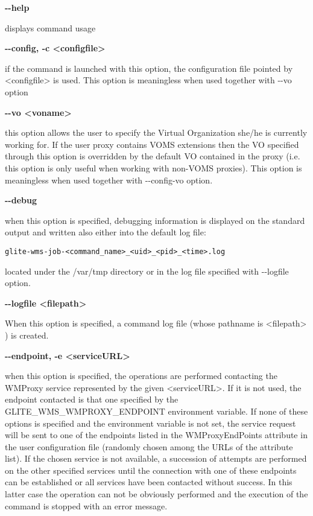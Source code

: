 \textbf{-{}-help}

displays command usage




\textbf{-{}-config, -c <configfile>}

if the command is launched with this option, the configuration file pointed by <configfile> is used. This option is meaningless when used together with -{}-vo option




\textbf{-{}-vo <voname>}

this option allows the user to specify the Virtual Organization she/he is currently working for.
If the user proxy contains VOMS extensions then the VO specified through this option is overridden by the
default VO contained in the proxy (i.e. this option is only useful when working with non-VOMS proxies).
This option is meaningless when used together with -{}-config-vo option.




\textbf{-{}-debug}

when this option is specified, debugging information is displayed on the standard output and written also either into the default log file:


\begin{verbatim}
glite-wms-job-<command_name>_<uid>_<pid>_<time>.log
\end{verbatim}

located under the /var/tmp  directory or in the log file specified with -{}-logfile option.




\textbf{-{}-logfile <filepath>}

When this option is specified, a command log file (whose pathname is <filepath> ) is created.





\textbf{-{}-endpoint, -e <serviceURL>}

when this option is specified, the operations are performed contacting the WMProxy 
service represented by the given <serviceURL>. 
If it is not used, the endpoint contacted is that one specified by the 
GLITE\_WMS\_WMPROXY\_ENDPOINT environment variable. 
If none of these options is specified and the environment variable is not set, 
the service request will be sent to one of the endpoints listed in the WMProxyEndPoints 
attribute in the user configuration file (randomly chosen among the URLs of the attribute list). 
If the chosen service is not available, a succession of attempts are performed on the other 
specified services until the connection with one of these endpoints can be established or all 
services have been contacted without success. In this latter case the operation can not be 
obviously performed and the execution of the command is stopped with an error message.




